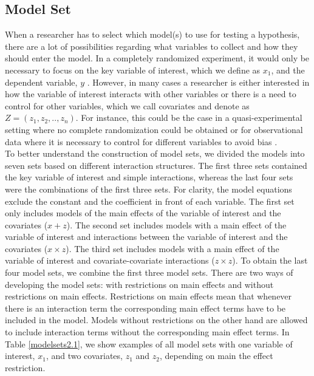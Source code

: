 \subsection{Model Set}
When a researcher has to select which model(s) to use for testing a hypothesis, there are a lot of possibilities regarding what variables to collect and how they should enter the model. In a completely randomized experiment, it would only be necessary to focus on the key variable of interest, which we define as $x_1$, and the dependent variable, $y$ \citep{angrist2008mostly}. However, in many cases a researcher is either interested in how the variable of interest interacts with other variables or there is a need to control for other variables, which we call covariates and denote as $Z=(z_1,z_2,..,z_n)$. For instance, this could be the case in a quasi-experimental setting where no complete randomization could be obtained or for observational data where it is necessary to control for different variables to avoid bias \citep{angrist2008mostly}. \\ 
To better understand the construction of model sets, we divided the models into seven sets based on different interaction structures. The first three sets contained the key variable of interest and simple interactions, whereas the last four sets were the combinations of the first three sets. For clarity, the model equations exclude the constant and the coefficient in front of each variable. The first set only includes models of the main effects of the variable of interest and the covariates ($x + z$). The second set includes models with a main effect of the variable of interest and interactions between the variable of interest and the covariates ($x \times z$). The third set includes models with a main effect of the variable of interest and covariate-covariate interactions ($z \times z$).
To obtain the last four model sets, we combine the first three model sets. There are two ways of developing the model sets: with restrictions on main effects and without restrictions on main effects. Restrictions on main effects mean that whenever there is an interaction term the corresponding main effect terms have to be included in the model. Models without restrictions on the other hand are allowed to include interaction terms without the corresponding main effect terms. In Table \ref{modelsets2.1}, we show examples of all model sets with one variable of interest, $x_{1}$, and two covariates, $z_{1}$ and $z_{2}$, depending on main the effect restriction. \\
 

